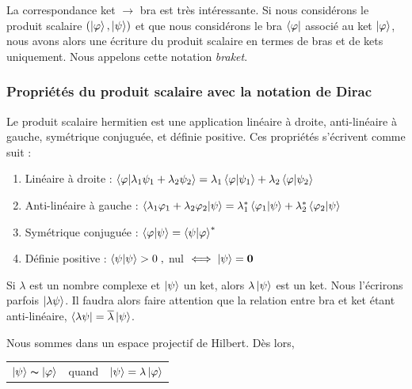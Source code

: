\documentclass[../notesdecours.tex]{subfiles}
\begin{document}
La correspondance ket $\rightarrow$ bra est très intéressante. Si nous considérons le produit scalaire $(\ket \varphi, \ket \psi)$ et que nous considérons le bra $\bra \varphi$ associé au ket $\ket \varphi$, nous avons alors une écriture du produit scalaire en termes de bras et de kets uniquement. Nous appelons cette notation \textit{braket}.

\subsubsection{Propriétés du produit scalaire avec la notation de Dirac}
Le produit scalaire hermitien est une application linéaire à droite, anti-linéaire à gauche, symétrique conjuguée, et définie positive. Ces propriétés s'écrivent comme suit :
\begin{enumerate}[label = \roman*)]
	\item Linéaire à droite : $\braket{\varphi |\lambda_1 \psi_1 + \lambda_2 \psi_2} = \lambda_1\braket{\varphi | \psi_1} + \lambda_2 \braket{\varphi | \psi_2}$
	\item Anti-linéaire à gauche : $\braket{\lambda_1 \varphi_1 + \lambda_2 \varphi_2 | \psi } = \lambda^* _1\braket{\varphi_1 | \psi} +\lambda_2^* \braket{\varphi_2 | \psi}$
	\item Symétrique conjuguée : $\braket{\varphi | \psi} = \braket{\psi | \varphi} ^*$
	\item Définie positive : $\braket{\psi | \psi} >0 \; , $ nul $\iff \ket\psi = \bm{0}$
\end{enumerate}


\begin{remark}\label{remark:correspondance antilinéaire} Si $\lambda$ est un nombre complexe et $\ket{\psi}$ un ket, alors $\lambda\ket{\psi}$ est un ket. Nous l'écrirons parfois $\ket{\lambda\psi}$. Il faudra alors faire attention que la relation entre bra et ket étant anti-linéaire, $\bra{\lambda\psi} = \overline{\lambda}\ket{\psi}$. \end{remark}
\begin{remark}
	Nous sommes dans un espace projectif de Hilbert. Dès lors,
	\begin{center}
	\begin{tabular}{ c c c } 
	$\ket{\psi} \thicksim \ket{\varphi}$ & quand & $\ket{\psi} = \lambda\ket{\varphi}$  
	\end{tabular}
	\end{center}
\end{remark}
\end{document}
